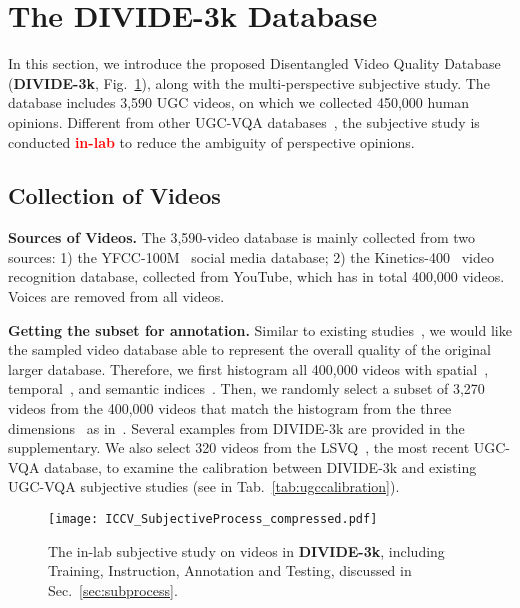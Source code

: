 \documentclass[10pt,twocolumn,letterpaper]{article}
\renewcommand{\paragraph}[1]{\noindent \textbf{#1}}
\newcommand{\bred}[1]{\textbf{\textcolor{red}{#1}}}
\begin{document}
\section{The DIVIDE-3k Database}


In this section, we introduce the proposed Disentangled Video Quality Database (\textbf{DIVIDE-3k}, Fig.~\ref{fig:divideprocess}), along with the multi-perspective subjective study. The database includes 3,590 UGC videos, on which we collected 450,000 human opinions. Different from other UGC-VQA databases~\cite{pvq,mlsp,kv1k}, the subjective study is conducted \bred{in-lab} to reduce the ambiguity of perspective opinions.

\subsection{Collection of Videos}

\paragraph{Sources of Videos.} The 3,590-video database is mainly collected from two sources: 1) the YFCC-100M~\cite{yfcc} social media database; 2) the Kinetics-400~\cite{k400data} video recognition database, collected from YouTube, which has in total 400,000 videos. Voices are removed from all videos. 

\paragraph{Getting the subset for annotation.} 
Similar to existing studies~\cite{kv1k,pvq}, we would like the sampled video database able to represent the overall quality of the original larger database. Therefore, we first histogram all 400,000 videos with spatial~\cite{niqe}, temporal~\cite{tpqi}, and semantic indices~\cite{clipiqa}. Then, we randomly select a subset of 3,270 videos from the 400,000 videos that match the histogram from the three dimensions~\cite{matchhistogram} as in~\cite{pvq,kv1k}. Several examples from DIVIDE-3k are provided in the supplementary. We also select 320 videos from the LSVQ~\cite{pvq}, the most recent UGC-VQA database, to examine the calibration between DIVIDE-3k and existing UGC-VQA subjective studies (see in Tab.~\ref{tab:ugccalibration}).


\begin{figure}
    \centering
    \texttt{[image: ICCV\_SubjectiveProcess\_compressed.pdf]}\vspace{-10pt}    \caption{The in-lab subjective study on videos in \textbf{DIVIDE-3k}, including Training, Instruction, Annotation and Testing, discussed in Sec.~\ref{sec:subprocess}.}
    \label{fig:divideprocess}
    \vspace{-17pt}
\end{figure}
\end{document}
